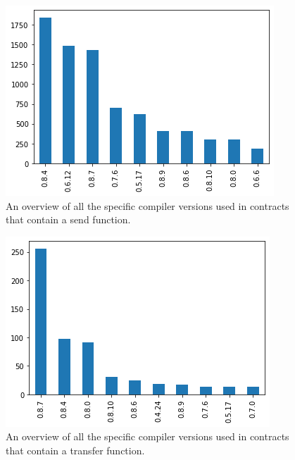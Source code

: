 \documentclass[sigconf]{acmart}
\begin{document}
\begin{figure}[h]
  \centering
  \includegraphics[width=\linewidth]{img/sends_versions.png}
  \caption{An overview of all the specific compiler versions used in contracts that contain a send function. }
  \label{fig:send_version}
\end{figure}

\begin{figure}[h]
  \centering
  \includegraphics[width=\linewidth]{img/transfers_versions.png}
  \caption{An overview of all the specific compiler versions used in contracts that contain a transfer function. }
  \label{fig:transfer_version}
\end{figure}
\end{document}
